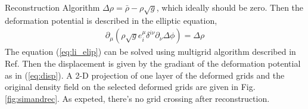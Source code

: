 \begin{section}{Reconstruction Algorithm}
$\Delta \rho = \bar{\rho}-\rho \sqrt{g}$, which ideally should be zero. Then the 
deformation potential is described in the elliptic equation,
\begin{align}
 \label{eq:li_elip}
    \partial _\mu (\rho \sqrt{g} e^\mu _i \delta^{i\nu}\partial_\nu \Delta \phi)=\Delta \rho
\end{align}
The equation (\ref{eq:li_elip}) can be solved using multigrid algorithm described in Ref. 
\cite{bib:Pen1995,bib:Pen1998} Then the displacement is given by the gradiant of the deformation 
potential as in (\ref{eq:disp}). A 2-D projection of one layer of the deformed grids and the 
original density field on the selected deformed grids are given in Fig. \ref{fig:simandrec}. 
As expeted, there's no grid crossing after reconstruction.
%
\end{section}

